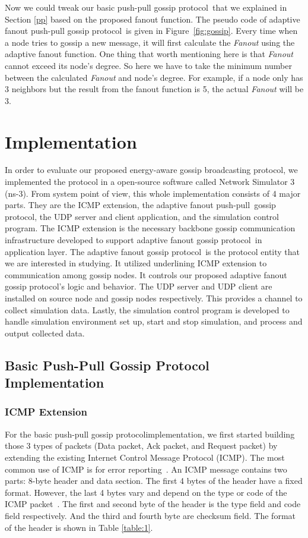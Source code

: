 \documentclass[onehalf,11pt]{beavtex}
\newcommand{\gp}{gossip protocol}
\newcommand{\msg}{message}
\newcommand{\pp}{push-pull}
\begin{document}
Now we could tweak our basic push-pull \gp ~that we explained in Section \ref{pp} based on the proposed fanout function. The pseudo code of adaptive fanout push-pull \gp ~is given in Figure~\ref{fig:gossip}. Every time when a node tries to gossip a new \msg, it will first calculate the \emph{Fanout} using the adaptive fanout function. One thing that worth mentioning here is that \emph{Fanout} cannot exceed its node's degree. So here we have to take the minimum number between the calculated \emph{Fanout} and node's degree. For example, if a node only has 3 neighbors but the result from the fanout function is 5, the actual \emph{Fanout} will be 3.





\chapter{Implementation}
\label{Chapter4}

In order to evaluate our proposed energy-aware gossip broadcasting protocol, we implemented the protocol in a open-source software called Network Simulator 3 (ns-3). From system point of view, this whole implementation consists of 4 major parts. They are the ICMP extension, the adaptive fanout \pp ~\gp, the UDP server and client application, and the simulation control program. The ICMP extension is the necessary backbone gossip communication infrastructure developed to support adaptive fanout \gp ~in application layer. The adaptive fanout \gp ~is the protocol entity that we are interested in studying. It utilized underlining ICMP extension to communication among gossip nodes. It controls our proposed adaptive fanout gossip protocol's logic and behavior. The UDP server and UDP client are installed on source node and gossip nodes respectively. This provides a channel to collect simulation data. Lastly, the simulation control program is developed to handle simulation environment set up, start and stop simulation, and process and output collected data.


\section{Basic Push-Pull Gossip Protocol Implementation} \label{ppi}
\subsection{ICMP Extension}
For the basic push-pull \gp implementation, we first started building those 3 types of packets (Data packet, Ack packet, and Request packet) by extending the existing Internet Control Message Protocol (ICMP). The most common use of ICMP is for error reporting~\cite{james}. An ICMP message contains two parts: 8-byte header and data section. The first 4 bytes of the header have a fixed format. However, the last 4 bytes vary and depend on the type or code of the ICMP packet~\cite{forouzan}. The first and second byte of the header is the type field and code field respectively. And the third and fourth byte are checksum field. The format of the header is shown in Table \ref{table:1}.
\end{document}
